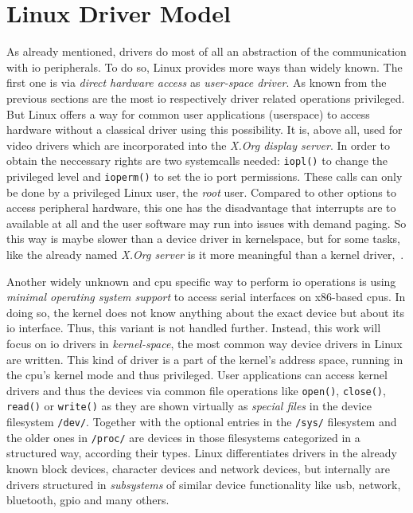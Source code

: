   
\section{Linux Driver Model}
As already mentioned, drivers do most of all an abstraction of the communication with \ac{io} peripherals.
To do so, Linux provides more ways than widely known.
The first one is via \textit{direct hardware access} as \textit{user-space driver}.
As known from the previous sections are the most \ac{io} respectively driver related operations privileged.
But Linux offers a way for common user applications (userspace) to access hardware without a classical driver using this possibility.
It is, above all, used for video drivers which are incorporated into the \textit{X.Org display server}.
In order to obtain the neccessary rights are two systemcalls needed: \texttt{iopl()} to change the privileged level and \texttt{ioperm()} to set the \ac{io} port permissions.
These calls can only be done by a privileged Linux user, the \textit{root} user.
Compared to other options to access peripheral hardware, this one has the disadvantage that interrupts are to available at all and the user software may run into issues with demand paging.
So this way is maybe slower than a device driver in kernelspace, but for some tasks, like the already named \textit{X.Org server} is it more meaningful than a kernel driver\cite{lfd430},~\cite{glatz2015betriebssysteme}.

Another widely unknown and \ac{cpu} specific way to perform \ac{io} operations is using \textit{minimal operating system support} to access serial interfaces on x86-based \acp{cpu}.
In doing so, the kernel does not know anything about the exact device but about its \ac{io} interface\cite{glatz2015betriebssysteme}.
Thus, this variant is not handled further.
Instead, this work will focus on \ac{io} drivers in \textit{kernel-space}, the most common way device drivers in Linux are written.
This kind of driver is a part of the kernel's address space, running in the \ac{cpu}'s kernel mode and thus privileged.
User applications can access kernel drivers and thus the devices via common file operations like \texttt{open()}, \texttt{close()}, \texttt{read()} or \texttt{write()} as they are shown virtually as \textit{special files} in the device filesystem \texttt{/dev/}.
Together with the optional entries in the \texttt{/sys/} filesystem and the older ones in \texttt{/proc/} are devices in those filesystems categorized in a structured way, according their types\cite{glatz2015betriebssysteme}.
Linux differentiates drivers in the already known block devices, character devices and network devices, but internally are drivers structured in \textit{subsystems} of similar device functionality like usb, network, bluetooth, gpio and many others\cite{quade2016Linux}. 




